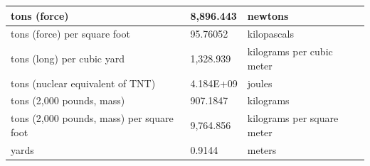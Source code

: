 \documentclass{fidata-report-template}
\begin{document}
{\begin{longtable}{||l|l|l||}
    \hline
    tons (force) & 8,896.443 & newtons\\
    \hline
    tons (force) per square foot & 95.76052 & kilopascals\\
    \hline
    tons (long) per cubic yard & 1,328.939 & kilograms per cubic meter\\
    \hline
    tons (nuclear equivalent of TNT) & 4.184E+09 & joules\\
    \hline
    tons (2,000 pounds, mass) & 907.1847 & kilograms\\
    \hline
    tons (2,000 pounds, mass) per square foot & 9,764.856 & kilograms per square meter\\
\hline
yards & 0.9144 & meters\\
\hline
\end{longtable}}

\mainmatter
\end{document}
